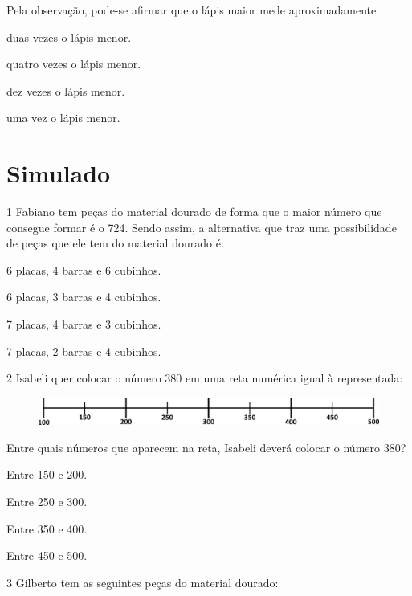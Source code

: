 Pela observação, pode-se afirmar que o lápis maior mede aproximadamente

\begin{escolha}
\item
  duas vezes o lápis menor.
\item
  quatro vezes o lápis menor.
\item
  dez vezes o lápis menor.
\item
  uma vez o lápis menor.
\end{escolha}

\chapter[Simulado 2]{Simulado}

\num{1} Fabiano tem peças do material dourado de forma que o maior número
que consegue formar é o 724. Sendo assim, a alternativa que traz uma
possibilidade de peças que ele tem do material dourado é:

\begin{escolha}
\item
  6 placas, 4 barras e 6 cubinhos.
\item
  6 placas, 3 barras e 4 cubinhos.
\item
  7 placas, 4 barras e 3 cubinhos.
\item
  7 placas, 2 barras e 4 cubinhos.
\end{escolha}

\num{2} Isabeli quer colocar o número 380 em uma reta numérica igual à representada:

\begin{figure}[htpb!]
\centering
\includegraphics[width=\textwidth]{./media/image102.png}
\end{figure}

Entre quais números que aparecem na reta, Isabeli deverá colocar o número 380?

\begin{escolha}
\item
  Entre 150 e 200.
\item
  Entre 250 e 300.
\item
  Entre 350 e 400.
\item
  Entre 450 e 500.
\end{escolha}

\pagebreak
\num{3} Gilberto tem as seguintes peças do material dourado:

